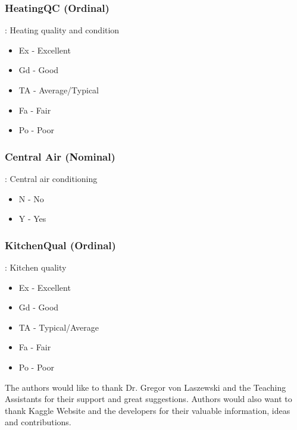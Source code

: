 \documentclass[sigconf]{acmart}
\begin{document}
	\subsubsection{HeatingQC (Ordinal)}: Heating quality and condition
	\begin{itemize}
		\item  Ex - Excellent
		\item  Gd - Good
		\item  TA - Average/Typical
		\item  Fa - Fair
		\item  Po - Poor
	\end{itemize}
	
	\subsubsection{Central Air (Nominal)}: Central air conditioning
	\begin{itemize}
		\item  N - No
		\item  Y - Yes
	\end{itemize}

	\subsubsection{KitchenQual (Ordinal)}: Kitchen quality
	\begin{itemize}
		\item  Ex - Excellent
		\item  Gd - Good
		\item  TA - Typical/Average
		\item  Fa - Fair
		\item  Po - Poor
	\end{itemize}
	
	
	\nocite{*}
	
	\begin{acks}	
			The authors would like to thank Dr. Gregor von Laszewski and the Teaching Assistants for their support and great suggestions. Authors would also want to thank Kaggle Website and the developers for their valuable information, ideas and contributions.		
	\end{acks}


	
	 	

	
\end{document}
